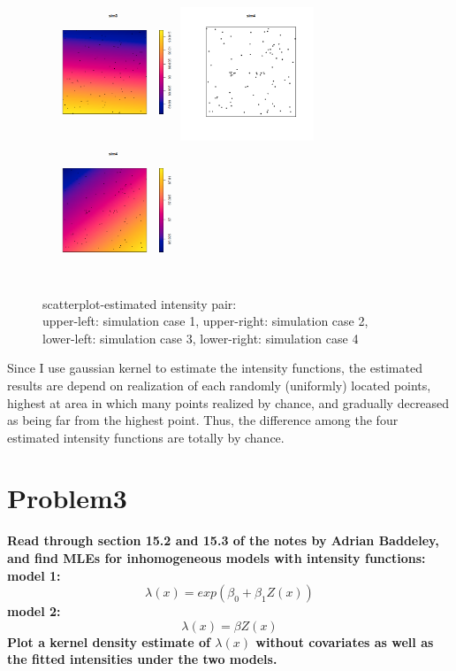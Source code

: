 \documentclass{article}
\begin{document}
\begin{figure}[!h]
    \includegraphics[width=4cm]{prob2_sim3_ker.png}
    \includegraphics[width=4cm]{prob2_sim4_scatterplot.png}
    \includegraphics[width=4cm]{prob2_sim4_ker.png}
    \caption{scatterplot-estimated intensity pair: \\
    upper-left: simulation case 1, upper-right: simulation case 2, \\
    lower-left: simulation case 3, lower-right: simulation case 4}
\end{figure}

Since I use gaussian kernel to estimate the intensity functions, 
the estimated results are depend on realization of each randomly (uniformly) located points,
highest at area in which many points realized by chance, and gradually decreased as being far from the highest point.
Thus, the difference among the four estimated intensity functions are totally by chance.


\clearpage
\section{Problem3}
\textbf{
Read through section 15.2 and 15.3 of the notes by Adrian Baddeley, and
find MLEs for inhomogeneous models with intensity functions:
model 1:
\[\lambda(x) = exp(\beta_0 + \beta_1 Z(x))\]
model 2:
\[\lambda(x) = \beta Z(x)\]
Plot a kernel density estimate of $\lambda(x)$ without covariates as well as the fitted intensities under the two models.
}
\end{document}
